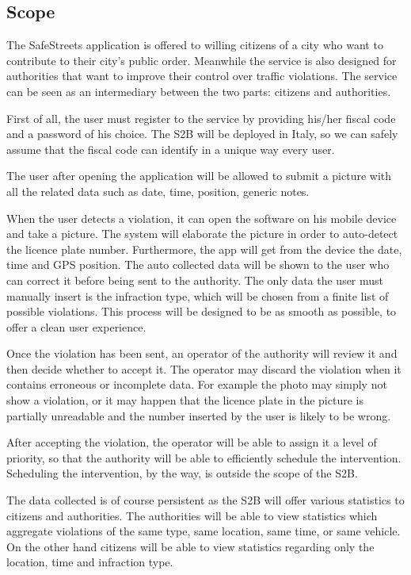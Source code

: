 \subsection{Scope}
The SafeStreets application is offered to willing citizens of a city who want 
to contribute to their city’s public order. Meanwhile the service is also 
designed for authorities that want to improve their control over traffic 
violations. 
The service can be seen as an intermediary between the two parts: citizens 
and authorities.


First of all, the user must register to the service by providing his/her 
fiscal code and a password of his choice. The S2B will be deployed in 
Italy, so we can safely assume that the fiscal code can identify in a 
unique way every user.

The user after opening the application will be allowed to submit a picture 
with all the related data such as date, time, position, generic notes.

When the user detects a violation, it can open the software on his mobile 
device and take a picture. The system will elaborate the picture in order to 
auto-detect the licence plate number. Furthermore, the app will get from the 
device the date, time and GPS position. The auto collected data will be shown 
to the user who can correct it before being sent to the authority.
The only data the user must manually insert is the infraction type, which 
will be chosen from a finite list of possible violations.
This process will be designed to be as smooth as possible, to offer a clean 
user experience.

Once the violation has been sent, an operator of the authority will review
it and then decide whether to accept it. The operator may discard the
violation when it contains erroneous or incomplete data. For example the
photo may simply not show a violation, or it may happen that the licence
plate in the picture is partially unreadable and the number inserted by
the user is likely to be wrong.

After accepting the violation, the operator will be able to assign it a level
of priority, so that the authority will be able to efficiently schedule the
intervention. Scheduling the intervention, by the way, is outside the scope
of the S2B.

The data collected is of course persistent as the S2B will offer various
statistics to citizens and authorities.
The authorities will be able to view statistics which aggregate violations
of the same type, same location, same time, or same vehicle.
On the other hand citizens will be able to view statistics regarding only 
the location, time and infraction type.

